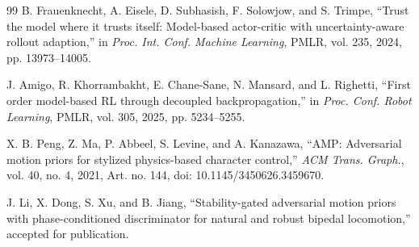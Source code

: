 \documentclass[letterpaper,10pt,conference]{ieeeconf}
\begin{document}
\begin{thebibliography}{99}
B. Frauenknecht, A. Eisele, D. Subhasish, F. Solowjow, and S. Trimpe, \textquotedblleft Trust the model where it trusts itself: Model-based actor-critic with uncertainty-aware rollout adaption,\textquotedblright{} in \emph{Proc. Int. Conf. Machine Learning}, PMLR, vol. 235, 2024, pp. 13973--14005.

J. Amigo, R. Khorrambakht, E. Chane-Sane, N. Mansard, and L. Righetti, ``First order model-based RL through decoupled backpropagation,'' in \emph{Proc. Conf. Robot Learning}, PMLR, vol. 305, 2025, pp. 5234--5255.

X. B. Peng, Z. Ma, P. Abbeel, S. Levine, and A. Kanazawa, ``AMP: Adversarial motion priors for stylized physics-based character control,'' \emph{ACM Trans. Graph.}, vol. 40, no. 4, 2021, Art. no. 144, doi: 10.1145/3450626.3459670.

J. Li, X. Dong, S. Xu, and B. Jiang, ``Stability-gated adversarial motion priors with phase-conditioned discriminator for natural and robust bipedal locomotion,'' accepted for publication.

\end{thebibliography}
\end{document}
